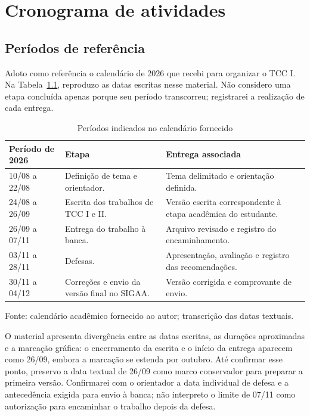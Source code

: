 \chapter{Cronograma de atividades}
\label{cap:cronograma}

\section{Períodos de referência}

Adoto como referência o calendário de 2026 que recebi para organizar o TCC I. Na Tabela~\ref{tab:calendario}, reproduzo as datas escritas nesse material. Não considero uma etapa concluída apenas porque seu período transcorreu; registrarei a realização de cada entrega.

\begin{table}[htb]
\centering
\caption{Períodos indicados no calendário fornecido}
\label{tab:calendario}
\small
\begin{tabular}{p{}p{}p{}}
\hline
\textbf{Período de 2026} & \textbf{Etapa} & \textbf{Entrega associada} \\ \hline
10/08 a 22/08 & Definição de tema e orientador. & Tema delimitado e orientação definida. \\ \hline
24/08 a 26/09 & Escrita dos trabalhos de TCC I e II. & Versão escrita correspondente à etapa acadêmica do estudante. \\ \hline
26/09 a 07/11 & Entrega do trabalho à banca. & Arquivo revisado e registro do encaminhamento. \\ \hline
03/11 a 28/11 & Defesas. & Apresentação, avaliação e registro das recomendações. \\ \hline
30/11 a 04/12 & Correções e envio da versão final no SIGAA. & Versão corrigida e comprovante de envio. \\ \hline
\end{tabular}
\par\smallskip
{\footnotesize Fonte: calendário acadêmico fornecido ao autor; transcrição das datas textuais.}
\end{table}

O material apresenta divergência entre as datas escritas, as durações aproximadas e a marcação gráfica: o encerramento da escrita e o início da entrega aparecem como 26/09, embora a marcação se estenda por outubro. Até confirmar esse ponto, preservo a data textual de 26/09 como marco conservador para preparar a primeira versão. Confirmarei com o orientador a data individual de defesa e a antecedência exigida para envio à banca; não interpreto o limite de 07/11 como autorização para encaminhar o trabalho depois da defesa.

